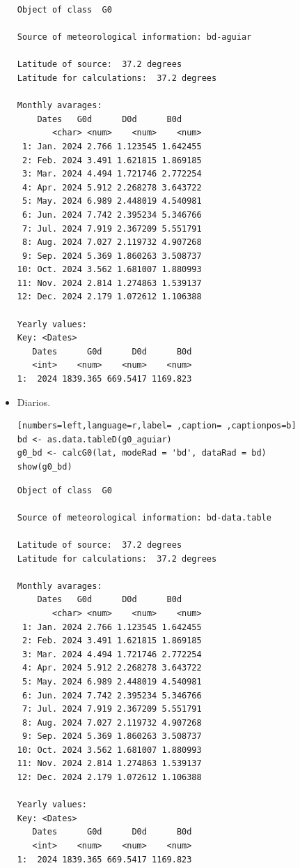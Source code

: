 \begin{itemize}
\begin{verbatim}
Object of class  G0 

Source of meteorological information: bd-aguiar 

Latitude of source:  37.2 degrees
Latitude for calculations:  37.2 degrees

Monthly avarages:
	Dates   G0d      D0d      B0d
       <char> <num>    <num>    <num>
 1: Jan. 2024 2.766 1.123545 1.642455
 2: Feb. 2024 3.491 1.621815 1.869185
 3: Mar. 2024 4.494 1.721746 2.772254
 4: Apr. 2024 5.912 2.268278 3.643722
 5: May. 2024 6.989 2.448019 4.540981
 6: Jun. 2024 7.742 2.395234 5.346766
 7: Jul. 2024 7.919 2.367209 5.551791
 8: Aug. 2024 7.027 2.119732 4.907268
 9: Sep. 2024 5.369 1.860263 3.508737
10: Oct. 2024 3.562 1.681007 1.880993
11: Nov. 2024 2.814 1.274863 1.539137
12: Dec. 2024 2.179 1.072612 1.106388

Yearly values:
Key: <Dates>
   Dates      G0d      D0d      B0d
   <int>    <num>    <num>    <num>
1:  2024 1839.365 669.5417 1169.823
\end{verbatim}

\item Diarios.
\begin{lstlisting}[numbers=left,language=r,label= ,caption= ,captionpos=b]
bd <- as.data.tableD(g0_aguiar)
g0_bd <- calcG0(lat, modeRad = 'bd', dataRad = bd)
show(g0_bd)
\end{lstlisting}

\begin{verbatim}
Object of class  G0 

Source of meteorological information: bd-data.table 

Latitude of source:  37.2 degrees
Latitude for calculations:  37.2 degrees

Monthly avarages:
	Dates   G0d      D0d      B0d
       <char> <num>    <num>    <num>
 1: Jan. 2024 2.766 1.123545 1.642455
 2: Feb. 2024 3.491 1.621815 1.869185
 3: Mar. 2024 4.494 1.721746 2.772254
 4: Apr. 2024 5.912 2.268278 3.643722
 5: May. 2024 6.989 2.448019 4.540981
 6: Jun. 2024 7.742 2.395234 5.346766
 7: Jul. 2024 7.919 2.367209 5.551791
 8: Aug. 2024 7.027 2.119732 4.907268
 9: Sep. 2024 5.369 1.860263 3.508737
10: Oct. 2024 3.562 1.681007 1.880993
11: Nov. 2024 2.814 1.274863 1.539137
12: Dec. 2024 2.179 1.072612 1.106388

Yearly values:
Key: <Dates>
   Dates      G0d      D0d      B0d
   <int>    <num>    <num>    <num>
1:  2024 1839.365 669.5417 1169.823
\end{verbatim}


\end{itemize}
